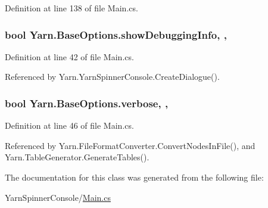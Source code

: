 Definition at line 138 of file Main.\-cs.

\hypertarget{a00043_a89964ea17bd19caf00cb5bff563ed01c}{
\subsubsection[{show\-Debugging\-Info}]{\setlength{\rightskip}{0pt plus 5cm}bool Yarn.\-Base\-Options.\-show\-Debugging\-Info\hspace{0.3cm}{\ttfamily [get]}, {\ttfamily [set]}, {\ttfamily [inherited]}}}\label{a00043_a89964ea17bd19caf00cb5bff563ed01c}


Definition at line 42 of file Main.\-cs.



Referenced by Yarn.\-Yarn\-Spinner\-Console.\-Create\-Dialogue().

\hypertarget{a00043_ada4d83d1756918f362d55f6649b82b17}{
\subsubsection[{verbose}]{\setlength{\rightskip}{0pt plus 5cm}bool Yarn.\-Base\-Options.\-verbose\hspace{0.3cm}{\ttfamily [get]}, {\ttfamily [set]}, {\ttfamily [inherited]}}}\label{a00043_ada4d83d1756918f362d55f6649b82b17}


Definition at line 46 of file Main.\-cs.



Referenced by Yarn.\-File\-Format\-Converter.\-Convert\-Nodes\-In\-File(), and Yarn.\-Table\-Generator.\-Generate\-Tables().



The documentation for this class was generated from the following file\-:\begin{DoxyCompactItemize}
\item 
Yarn\-Spinner\-Console/\hyperlink{a00328}{Main.\-cs}\end{DoxyCompactItemize}
